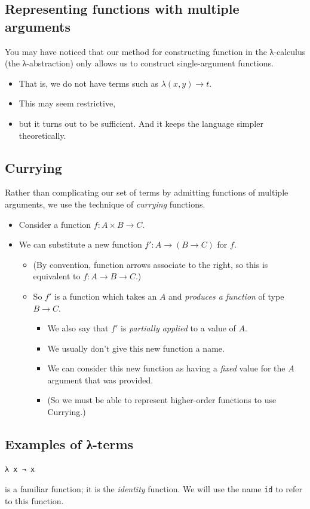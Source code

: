 \documentclass[11pt]{article}
\theoremstyle{definition}
\begin{document}
\subsection{Representing functions with multiple arguments}
\label{sec:org2af8b1f}
You may have noticed that our method for constructing function
in the λ-calculus (the λ-abstraction)
only allows us to construct single-argument functions.
\begin{itemize}
\item That is, we do not have terms such as \(λ(x,y) → t\).
\item This may seem restrictive,
\item but it turns out to be sufficient.
And it keeps the language simpler theoretically.
\end{itemize}

\subsection{Currying}
\label{sec:org60dbf92}
Rather than complicating our set of terms by admitting
functions of multiple arguments, we use the technique
of \emph{currying} functions.
\begin{itemize}
\item Consider a function \(f : A × B → C\).
\item We can substitute a new function \(f′ : A → (B → C)\)
for \(f\).
\begin{itemize}
\item (By convention, function arrows associate to the right,
so this is equivalent to \(f : A → B → C\).)
\item So \(f′\) is a function which takes an \(A\) and
\emph{produces a function} of type \(B → C\).
\begin{itemize}
\item We also say that \(f′\) is \emph{partially applied} to a value of \(A\).
\item We usually don't give this new function a name.
\item We can consider this new function as having a \emph{fixed} value
for the \(A\) argument that was provided.
\item (So we must be able to represent higher-order functions
to use Currying.)
\end{itemize}
\end{itemize}
\end{itemize}

\subsection{Examples of λ-terms}
\label{sec:org8a58bb8}
\begin{verbatim}
λ x → x
\end{verbatim}
is a familiar function; it is the \emph{identity} function.
We will use the name \texttt{id} to refer to this function.
\end{document}
